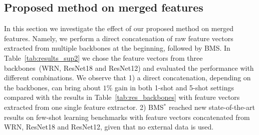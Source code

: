 \documentclass[review]{elsarticle}
\begin{document}
\begin{table}[h]
    \caption{Accuracy and AUROC of Proposed method for Few-Shot Open-Set Recognition.}
    \centering
    \label{tab:results_sup1}
\end{table}

\subsection{Proposed method on merged features}
In this section we investigate the effect of our proposed method on merged features. Namely, we perform a direct concatenation of raw feature vectors extracted from multiple backbones at the beginning, followed by BMS. In Table~\ref{tab:results_sup2} we chose the feature vectors from three backbones~(WRN, ResNet18 and ResNet12) and evaluated the performance with different combinations. We observe that 1) a direct concatenation, depending on the backbones, can bring about $1\%$ gain in both 1-shot and 5-shot settings compared with the results in Table~\ref{tab:res_backbones} with feature vectors extracted from one single feature extractor. 2) BMS$^*$ reached new state-of-the-art results on few-shot learning benchmarks with feature vectors concatenated from WRN, ResNet18 and ResNet12, given that no external data is used. 
\end{document}
